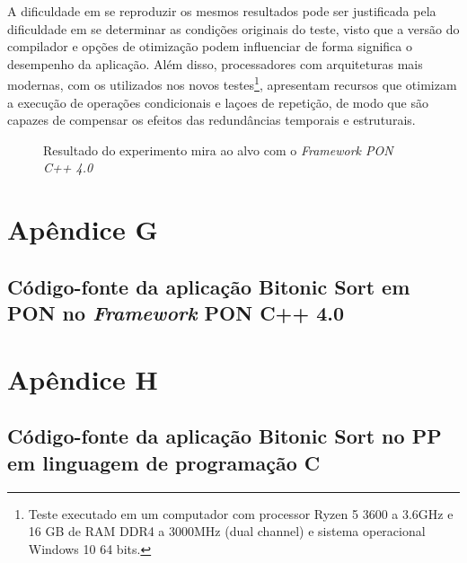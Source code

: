 A dificuldade em se reproduzir os mesmos resultados pode ser justificada pela
dificuldade em se determinar as condições originais do teste, visto que a versão
do compilador e opções de otimização podem influenciar de forma significa o
desempenho da aplicação. Além disso, processadores com arquiteturas mais
modernas, com os utilizados nos novos testes\footnote{Teste executado em um
computador com processor Ryzen 5 3600 a 3.6GHz e 16 GB de RAM DDR4 a 3000MHz
(dual channel) e sistema operacional Windows 10 64 bits.}, apresentam recursos
que otimizam a execução de operações condicionais e laçoes de repetição, de modo
que são capazes de compensar os efeitos das redundâncias temporais e
estruturais.

\begin{figure}[t!]
\centering
{}
\caption{Resultado do experimento mira ao alvo com o \textit{Framework PON C++ 4.0}}
\label{fig:mira_alvo_result_2}
\end{figure}


\chapter*{Apêndice G}\label{ap:apendice_bitonic}
\section*{Código-fonte da aplicação Bitonic Sort em PON no \textit{Framework} PON C++ 4.0}


\chapter*{Apêndice H}\label{ap:bitonic_c}
\section*{Código-fonte da aplicação Bitonic Sort no PP em linguagem de programação C}


